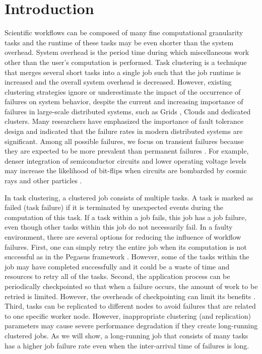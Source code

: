 \documentclass{IOS-Book-Article}
\begin{document}
\section*{Introduction}


Scientific workflows can be composed of many fine computational granularity tasks and the runtime of these tasks may be even shorter than the system overhead. System overhead is the period time during which miscellaneous work other than the user’s computation is performed. Task clustering \cite{Chen2013, Singh2008, Chen2012, Maheshwari2012, Ferreira-granularity-2013, Integration2012} is a technique that merges several short tasks into a single job such that the job runtime is increased and the overall system overhead is decreased. However, existing clustering strategies ignore or underestimate the impact of the occurrence of failures on system behavior, despite the current and increasing importance of failures in large-scale distributed systems, such as Grids \cite{Bresnahan2011, Deelman2004, Rubing2005}, Clouds \cite{Deelman2008, Berriman2010, Bresnahan2011} and dedicated clusters. Many researchers \cite{Zhang2004, Tang1990, Schroeder2006, Sahoo2004} have emphasized the importance of fault tolerance design and indicated that the failure rates in modern distributed systems are significant. Among all possible failures, we focus on transient failures because they are expected to be more prevalent than permanent failures \cite{Zhang2004}. For example, denser integration of semiconductor circuits and lower operating voltage levels may increase the likelihood of bit-flips when circuits are bombarded by cosmic rays and other particles \cite{Zhang2004}. 

In task clustering, a clustered job consists of multiple tasks. A task is marked as failed (task failure) if it is terminated by unexpected events during the computation of this task. If a task within a job fails, this job has a job failure, even though other tasks within this job do not necessarily fail. 
In a faulty environment, there are several options for reducing the influence of workflow failures. First, one can simply retry the entire job when its computation is not successful as in the Pegasus framework \cite{Deelman2004}. However, some of the tasks within the job may have completed successfully and it could be a waste of time and resources to retry all of the tasks. Second, the application process can be periodically checkpointed so that when a failure occurs, the amount of work to be retried is limited. However, the overheads of checkpointing can limit its benefits \cite{Zhang2004}. Third, tasks can be replicated to different nodes to avoid failures that are related to one specific worker node. However, inappropriate clustering (and replication) parameters may cause severe performance degradation if they create long-running clustered jobs. As we will show, a long-running job that consists of many tasks has a higher job failure rate even when the inter-arrival time of failures is long. 
\end{document}
